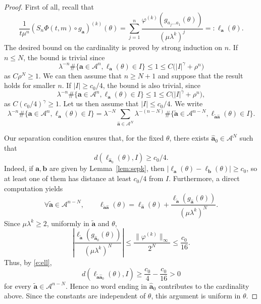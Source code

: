 \documentclass[11pt]{amsart}
\theoremstyle{plain}
\theoremstyle{definition}
\numberwithin{equation}{section}
\begin{document}
\begin{proof}
First of all, recall that
$$
\frac{1}{t \mu^n}(S_n \Phi(t,m) \circ g_\mathbf{a})^{(k)}(\theta)
= \sum_{j=1}^{n} \frac{\varphi^{(k)}(g_{a_j \dots a_1}(\theta))}{(\mu \lambda^k)^j}
=: \ell_\mathbf{a}(\theta).
$$
The desired bound on the cardinality is proved by strong induction on $n$. If $n \leq N$, the bound is trivial since
$$
\lambda^{-n} \#\{ \mathbf{a} \in \mathcal{A}^n, \ell_\mathbf{a}(\theta) \in I \}
\leq 1 \leq C\Big( |I|^\gamma + \rho^n \Big)
$$
as $C \rho^{N} \geq 1$. We can then assume that $n \geq N+1$ and suppose that the result holds for smaller $n$. If $|I| \geq c_0/4$, the bound is also trivial, since
$$
\lambda^{-n} \#\{ \mathbf{a} \in \mathcal{A}^n, \ell_\mathbf{a}(\theta) \in I \}
\leq 1 \leq C\Big( |I|^\gamma + \rho^n \Big),
$$
as $C (c_0/4)^{\gamma} \geq 1$. Let us then assume that $|I| \leq c_0/4$. We write
$$
\lambda^{-n} \#\{ \mathbf{a} \in \mathcal{A}^n, \ell_\mathbf{a}(\theta) \in I \}
= \lambda^{-N} \sum_{\widehat{\mathbf{a}} \in \mathcal{A}^N }
\lambda^{-(n-N)} \# \{\tilde{\mathbf{a}} \in \mathcal{A}^{n-N},
\ell_{\tilde{\mathbf{a}}\widehat{\mathbf{a}}}(\theta) \in I \}.
$$

Our separation condition ensures that, for the fixed $\theta$, there exists $\widehat{\mathbf a}_0\in\mathcal A^N$ such that
$$
d(\ell_{\widehat{\mathbf a}_0}(\theta),I)\geq c_0/4.
$$
Indeed, if $\mathbf a,\mathbf b$ are given by Lemma~\ref{lem:sepk}, then $|\ell_{\mathbf a}(\theta)-\ell_{\mathbf b}(\theta)|\geq c_0$, so at least one of them has distance at least $c_0/4$ from $I$. Furthermore, a direct computation yields
\begin{equation}\label{e:ell}
\forall \tilde{\mathbf{a}} \in \mathcal{A}^{n-N}, \qquad
\ell_{\tilde{\mathbf{a}}\widehat{\mathbf{a}}}(\theta)
=
\ell_{\widehat{\mathbf{a}}}(\theta)
+
\frac{\ell_{\tilde{\mathbf{a}}}(g_{\widehat{\mathbf{a}}}(\theta))}
{(\mu \lambda^k)^N}.
\end{equation}
Since $\mu\lambda^k\geq2$, uniformly in $\tilde{\mathbf a}$ and $\theta$,
$$
\left|
\frac{\ell_{\tilde{\mathbf{a}}}(g_{\widehat{\mathbf{a}}_0}(\theta))}
{(\mu \lambda^k)^N}
\right|
\leq \frac{\|\varphi^{(k)}\|_\infty}{2^N}
\leq \frac{c_0}{16}.
$$
Thus, by \eqref{e:ell},
$$
d(\ell_{\tilde{\mathbf a}\widehat{\mathbf a}_0}(\theta),I)
\geq \frac{c_0}{4}-\frac{c_0}{16}>0
$$
for every $\tilde{\mathbf a}\in\mathcal A^{n-N}$. Hence no word ending in $\widehat{\mathbf a}_0$ contributes to the cardinality above. Since the constants are independent of $\theta$, this argument is uniform in $\theta$.


\end{proof}
\end{document}
